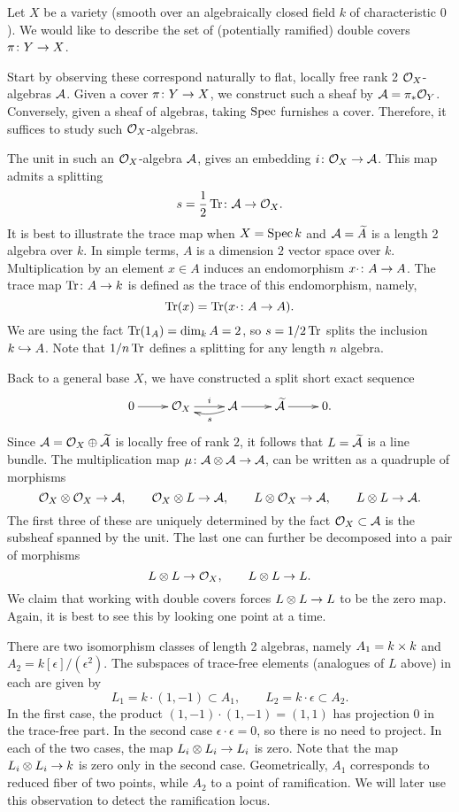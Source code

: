 Let $X$ be a variety (smooth over an algebraically closed field $k$ of characteristic $0$). We would like to describe the set of (potentially ramified) double covers $\pi \cn Y \rarr X$.

Start by observing these correspond naturally to flat, locally free rank 2 $\mathcal{O}_X$-algebras $\mathcal{A}$. Given a cover $\pi \cn Y \rarr X$, we construct such a sheaf by $\mathcal{A} = \pi_\ast \mathcal{O}_Y$. Conversely, given a sheaf of algebras, taking $\operatorname{Spec}$ furnishes a cover. Therefore, it suffices to study such $\mathcal{O}_X$-algebras.

The unit in such an $\mathcal{O}_X$-algebra $\mathcal{A}$, gives an embedding $i \cn \Oc_X \rarr \Ac$. This map admits a splitting
\[
s = \frac{1}{2} \Tr \cn \Ac \rarr \Oc_X.
\]
It is best to illustrate the trace map when $X = \operatorname{Spec} k$ and $\mathcal{A} = \widetilde{A}$ is a length 2 algebra over $k$. In simple terms, $A$ is a dimension $2$ vector space over $k$. Multiplication by an element $x \in A$ induces an endomorphism $x \cdot \cn A \rarr A$. The trace map $\Tr \cn A \rarr k$ is defined as the trace of this endomorphism, namely,
\[
\Tr(x) = \Tr( x \cdot \cn A \rarr A ).
\]
We are using the fact $\operatorname{Tr}(1_A) = \dim_k A = 2$, so $s = 1/2 \operatorname{Tr}$ splits the inclusion $k \hookrightarrow A$. Note that $1/n \operatorname{Tr}$ defines a splitting for any length $n$ algebra.

Back to a general base $X$, we have constructed a split short exact sequence
\[\xymatrix{
  0 \ar[r] &
  \Oc_X \ar[r]^-{i} &
  \Ac \ar@/^/[l]^-{s} \ar[r] &
  \wtilde{\Ac} \ar[r] &
  0.
}\]
Since $\mathcal{A} = \mathcal{O}_X \oplus \widetilde{\mathcal{A}}$ is locally free of rank $2$, it follows that $L = \widetilde{\mathcal{A}}$ is a line bundle. The multiplication map $\mu \cn \Ac \otimes \Ac \rarr \Ac$, can be written as a quadruple of morphisms
\[
\Oc_X \otimes \Oc_X \rarr \Ac, \qquad
\Oc_X \otimes L \rarr \Ac, \qquad
L \otimes \Oc_X \rarr \Ac, \qquad
L \otimes L \rarr \Ac.
\]
The first three of these are uniquely determined by the fact $\mathcal{O}_X \subset \mathcal{A}$ is the subsheaf spanned by the unit. The last one can further be decomposed into a pair of morphisms
\[
L \otimes L \rarr \Oc_X, \qquad
L \otimes L \rarr L.
\]
We claim that working with double covers forces $L \otimes L \rarr L$ to be the zero map. Again, it is best to see this by looking one point at a time.

There are two isomorphism classes of length 2 algebras, namely $A_1 = k \times k$ and $A_2 = k[\epsilon]/(\epsilon^2)$. The subspaces of trace-free elements (analogues of $L$ above) in each are given by
\[
L_1 = k \cdot (1,-1) \subset A_1, \qquad
L_2 = k \cdot \epsilon \subset A_2.
\]
In the first case, the product $(1,-1) \cdot (1,-1) = (1,1)$ has projection $0$ in the trace-free part. In the second case $\epsilon \cdot \epsilon = 0$, so there is no need to project. In each of the two cases, the map $L_i \otimes L_i \rarr L_i$ is zero. Note that the map $L_i \otimes L_i \rarr k$ is zero only in the second case. Geometrically, $A_1$ corresponds to reduced fiber of two points, while $A_2$ to a point of ramification. We will later use this observation to detect the ramification locus.

